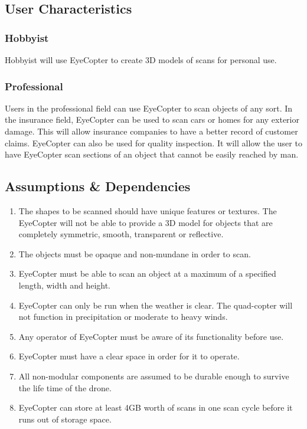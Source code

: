 \documentclass[10pt,letterpaper]{article}
\begin{document}
\subsection{User Characteristics}

\subsubsection{Hobbyist}

Hobbyist will use EyeCopter to create 3D models of scans for personal use.

\subsubsection{Professional}

Users in the professional field can use EyeCopter to scan objects of any sort. In the insurance field, EyeCopter can be used to scan cars or homes for any exterior damage. This will allow insurance companies to have a better record of customer claims. EyeCopter can also be used for quality inspection. It will allow the user to have EyeCopter scan sections of an object that cannot be easily reached by man.

\subsection{Assumptions \& Dependencies}
\begin{enumerate}[label=\textbf{AD\arabic*}]
	\item The shapes to be scanned should have unique features or textures. The EyeCopter will not be able to provide a 3D model for objects that are completely symmetric, smooth, transparent or reflective.
    \item The objects must be opaque and non-mundane in order to scan.
    \item EyeCopter must be able to scan an object at a maximum of a specified length, width and height.
    \item EyeCopter can only be run when the weather is clear. The quad-copter will not function in precipitation or moderate to heavy winds.
    \item Any operator of EyeCopter must be aware of its functionality before use.
    \item EyeCopter must have a clear space in order for it to operate.
    \item All non-modular components are assumed to be durable enough to survive the life time of the drone.
    \item EyeCopter can store at least 4GB worth of scans in one scan cycle before it runs out of storage space.
    
\end{enumerate}
\end{document}
